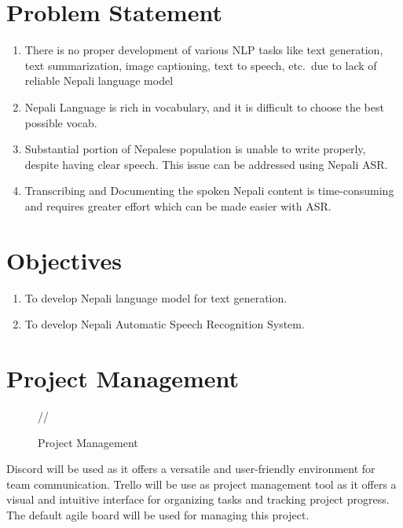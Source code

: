 \section{Problem Statement}
\begin{enumerate}
    
    \item There is no proper development of various NLP tasks like text generation, text summarization, image captioning, text to speech, etc.\ due to lack of reliable Nepali language model
    \item Nepali Language is rich in vocabulary, and it is difficult to choose the best possible vocab.
    \item Substantial portion of Nepalese population is unable to write properly, despite having clear speech. This issue can be addressed using Nepali ASR.
    \item Transcribing and Documenting the spoken Nepali content is time-consuming and requires greater effort which can be made easier with ASR.
\end{enumerate}

\section{Objectives}
\begin{enumerate}
    \item To develop Nepali language model for text generation.
    \item To develop Nepali Automatic Speech Recognition System.
\end{enumerate}

\section{Project Management}
\begin{figure}[H]
    \centering
    
    //
    \caption{Project Management}
    \label{fig:my_label}
\end{figure}

Discord will be used as it offers a versatile and user-friendly environment for team communication. Trello will be use as project management tool as it offers a visual and intuitive interface for organizing tasks and tracking project progress. The default agile board will be used for managing this project.


